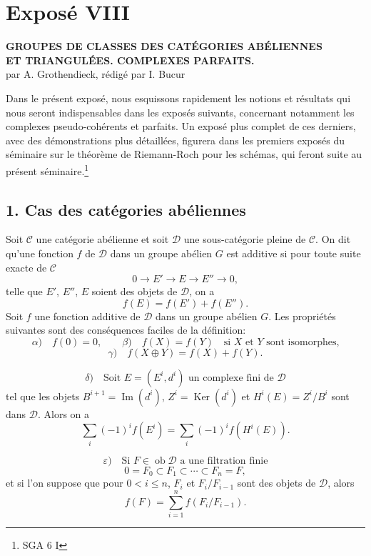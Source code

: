 \documentclass[11pt]{article}
\providecommand{\Ob}{\operatorname{ob}}
\providecommand{\cC}{\mathcal C}
\providecommand{\Ob}{\operatorname{ob}}
\providecommand{\cC}{\mathcal C}
\providecommand{\cD}{\mathcal D}
\providecommand{\Ob}{\operatorname{Ob}}
\providecommand{\Ob}{\operatorname{ob}}
\providecommand{\Ob}{\operatorname{Ob}}
\begin{document}
\newpage
\section*{Exposé VIII}

\begin{center}
\textbf{GROUPES DE CLASSES DES CATÉGORIES ABÉLIENNES}\\
\textbf{ET TRIANGULÉES. COMPLEXES PARFAITS.}\\[1ex]
par A. Grothendieck, rédigé par I. Bucur
\end{center}

Dans le présent exposé, nous esquissons rapidement les notions et résultats qui nous seront indispensables dans les exposés suivants, concernant notamment les complexes pseudo-cohérents et parfaits. Un exposé plus complet de ces derniers, avec des démonstrations plus détaillées, figurera dans les premiers exposés du séminaire sur le théorème de Riemann-Roch pour les schémas, qui feront suite au présent séminaire.\footnote{SGA 6 I}

\subsection*{1. Cas des catégories abéliennes}

Soit $\cC$ une catégorie abélienne et soit $\cD$ une sous-catégorie pleine de $\cC$. On dit qu'une fonction $f$ de $\cD$ dans un groupe abélien $G$ est additive si pour toute suite exacte de $\cC$
\[
0\longrightarrow E'\longrightarrow E\longrightarrow E''\longrightarrow 0,
\]
telle que $E'$, $E''$, $E$ soient des objets de $\cD$, on a
\[
f(E)=f(E')+f(E'').
\]
Soit $f$ une fonction additive de $\cD$ dans un groupe abélien $G$. Les propriétés suivantes sont des conséquences faciles de la définition:
\[
\alpha)\quad f(0)=0,\qquad
\beta)\quad f(X)=f(Y)\quad\text{si }X\text{ et }Y\text{ sont isomorphes,}
\]
\[
\gamma)\quad f(X\oplus Y)=f(X)+f(Y).
\]

\[
\delta)\quad
\text{Soit }E=(E^i,d^i)\text{ un complexe fini de }\cD
\]
tel que les objets $B^{i+1}=\operatorname{Im}(d^i)$, $Z^i=\operatorname{Ker}(d^i)$ et $H^i(E)=Z^i/B^i$ sont dans $\cD$. Alors on a
\[
\sum_i (-1)^i f(E^i)=\sum_i (-1)^i f(H^i(E)).
\]

\[
\varepsilon)\quad
\text{Si }F\in\Ob \cD\text{ a une filtration finie}
\]
\[
0=F_0\subset F_1\subset\cdots\subset F_n=F,
\]
et si l'on suppose que pour $0<i\le n$, $F_i$ et $F_i/F_{i-1}$ sont des objets de $\cD$, alors
\[
f(F)=\sum_{i=1}^n f(F_i/F_{i-1}).
\]
\end{document}
